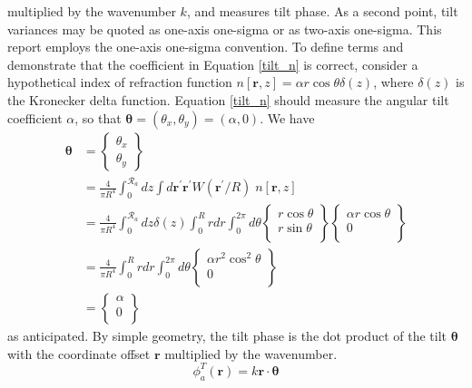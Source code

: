multiplied by the wavenumber $k$, and measures tilt phase.  As a
second point, tilt variances may be quoted as one-axis one-sigma or as
two-axis one-sigma.  This report employs the one-axis one-sigma
convention.  To define terms and demonstrate that the coefficient in
Equation \ref{tilt_n} is correct, consider a hypothetical index of
refraction function $n\left[\boldsymbol{r},z\right] = \alpha r \cos
\theta \delta\left(z\right)$, where $\delta\left(z\right)$ is the
Kronecker delta function.  Equation \ref{tilt_n} should measure the
angular tilt coefficient $\alpha$, so that $\boldsymbol{\theta} =
\left(\theta_{x}, \theta_{y}\right) = \left(\alpha, 0\right)$.  We
have
\begin{equation}
\begin{aligned}
\boldsymbol{\theta} & = 
\left\{
\begin{array}{c}
\theta_{x} \\
\theta_{y} 
\end{array} 
\right\}\\
& = 
\frac{4}{\pi R^{4}} \int_{0}^{\mathcal{R}_{a}} dz 
\int d\boldsymbol{r}^{\prime} \boldsymbol{r}^{\prime} W(\boldsymbol{r}^{\prime}/R) \; n\left[\boldsymbol{r},z\right] \\
& = 
\frac{4}{\pi R^{4}} \int_{0}^{\mathcal{R}_{a}} dz \delta\left(z\right)
\int_{0}^{R} r dr \int_{0}^{2\pi} d\theta 
\left\{
\begin{array}{c}
r \cos \theta \\
r \sin \theta \\ 
\end{array}
\right\}
\left\{
\begin{array}{c}
\alpha r \cos \theta \\
0 \\ 
\end{array}
\right\} \\
& = 
\frac{4}{\pi R^{4}}  
\int_{0}^{R} r dr \int_{0}^{2\pi} d\theta 
\left\{
\begin{array}{c}
\alpha r^{2} \cos^{2} \theta \\
0 \\ 
\end{array}
\right\}\\
& = 
\left\{
\begin{array}{c}
\alpha \\
0 \\ 
\end{array}
\right\}
\end{aligned}
\end{equation}
as anticipated.  By simple geometry, the tilt phase is the dot product
of the tilt $\boldsymbol{\theta}$ with the coordinate offset
$\boldsymbol{r}$ multiplied by the wavenumber.
\begin{equation}\label{tiltphase_n}
\phi^{T}_{a}\left(\boldsymbol{r}\right) = k \boldsymbol{r}  \cdot \boldsymbol{\theta} 
\end{equation}

